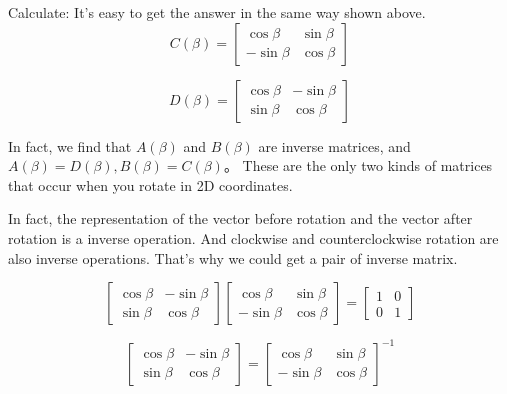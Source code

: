 \documentclass{article} %
\numberwithin{equation}{section} %
\begin{document}
Calculate:
It's easy to get the answer in the same way shown above.
\begin{equation}\label{2d_rotation_matrix_clockwise_new_to_old}
C(\beta)=\begin{bmatrix}\cos\beta & \sin\beta \\-\sin\beta & \cos\beta \end{bmatrix}
\end{equation}

\begin{equation}\label{2d_rotation_matrix_clockwise_old_to_new}
D(\beta)=\begin{bmatrix}\cos\beta & -\sin\beta \\ \sin\beta & \cos\beta \end{bmatrix}
\end{equation}

In fact, we find that $A(\beta)$ and $B(\beta)$ are inverse matrices, and $A(\beta)=D(\beta), B(\beta)=C(\beta)$。
These are the only two kinds of matrices that occur when you rotate in 2D coordinates.

In fact, the representation of the vector before rotation and the vector after rotation is a inverse operation. 
And clockwise and counterclockwise rotation are also inverse operations.
That's why we could get a pair of inverse matrix.

\begin{equation}\label{2d_rotation_matrix_anticlockwise_old_to_new}
\begin{bmatrix}\cos\beta & -\sin\beta \\ \sin\beta & \cos\beta \end{bmatrix}
\begin{bmatrix}\cos\beta & \sin\beta \\-\sin\beta & \cos\beta \end{bmatrix} =
\begin{bmatrix}1&0\\0&1\end{bmatrix}
\end{equation}

\begin{equation}\label{2d_rotation_matrix_anticlockwise_old_to_new}
\begin{bmatrix}\cos\beta & -\sin\beta \\ \sin\beta & \cos\beta \end{bmatrix} = 
\begin{bmatrix}\cos\beta & \sin\beta \\-\sin\beta & \cos\beta \end{bmatrix}^{-1}
\end{equation}
\end{document}
